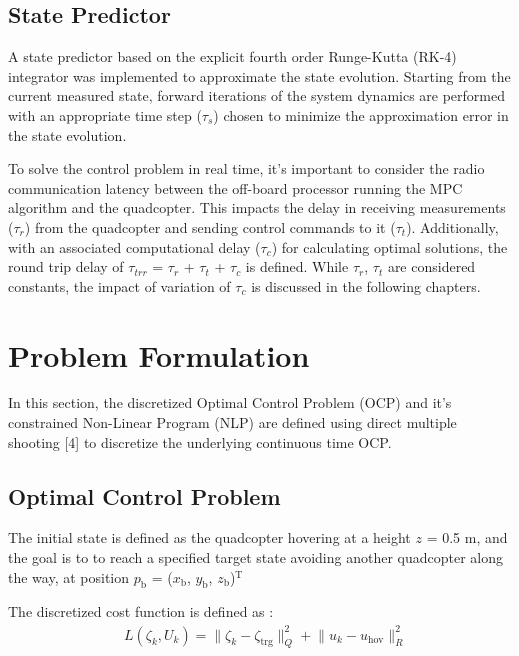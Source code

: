 \documentclass[conference]{IEEEtran}
\begin{document}
\subsection{State Predictor}

A state predictor based on the explicit fourth order Runge-Kutta (RK-4) integrator was implemented to approximate the state evolution. Starting from the current measured state, forward iterations of the system dynamics are performed with an appropriate time step ($\tau_{s}$) chosen to minimize the approximation error in the state evolution.

To solve the control problem in real time, it's important to consider the radio communication latency between the off-board processor running the MPC algorithm and the quadcopter. This impacts the delay in receiving measurements ($\tau_{r}$) from the quadcopter and sending control commands to it ($\tau_{t}$). Additionally, with an associated computational delay ($\tau_{c}$) for calculating optimal solutions, the round trip delay of $\tau_{trr}$ = $\tau_r$ + $\tau_t$ + $\tau_c$ is defined. While $\tau_{r}$, $\tau_{t}$ are considered constants, the impact of variation of $\tau_{c}$ is discussed in the following chapters.

\section{Problem Formulation}\label{Section3}

In this section, the discretized Optimal Control Problem (OCP) and it's constrained Non-Linear Program (NLP) are defined using direct multiple shooting [4] to discretize the underlying continuous time OCP.

\subsection{Optimal Control Problem}

The initial state is defined as the quadcopter hovering at a height $z$ = 0.5 m, and the goal is to to reach a specified target state avoiding another quadcopter along the way, at position  $p_\mathrm{b}$ = ($x_\mathrm{b}$, $y_\mathrm{b}$, $z_\mathrm{b}$)$\mathrm{^{T}}$

The discretized cost function is defined as :
\begin{align}
	& L\left(\zeta_k, U_k\right) = \lVert \zeta_k - \zeta_{\mathrm{trg}} \rVert^2_Q + \lVert u_k - u_{\mathrm{hov}} \rVert^2_R
\end{align}
\end{document}
